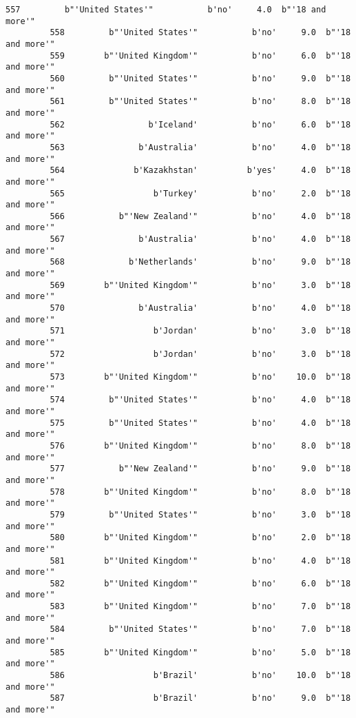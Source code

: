 \documentclass[11pt]{article}
\begin{document}
\begin{Verbatim}[commandchars=\\\{\}]
         557         b"'United States'"           b'no'     4.0  b"'18 and more'"   
         558         b"'United States'"           b'no'     9.0  b"'18 and more'"   
         559        b"'United Kingdom'"           b'no'     6.0  b"'18 and more'"   
         560         b"'United States'"           b'no'     9.0  b"'18 and more'"   
         561         b"'United States'"           b'no'     8.0  b"'18 and more'"   
         562                 b'Iceland'           b'no'     6.0  b"'18 and more'"   
         563               b'Australia'           b'no'     4.0  b"'18 and more'"   
         564              b'Kazakhstan'          b'yes'     4.0  b"'18 and more'"   
         565                  b'Turkey'           b'no'     2.0  b"'18 and more'"   
         566           b"'New Zealand'"           b'no'     4.0  b"'18 and more'"   
         567               b'Australia'           b'no'     4.0  b"'18 and more'"   
         568             b'Netherlands'           b'no'     9.0  b"'18 and more'"   
         569        b"'United Kingdom'"           b'no'     3.0  b"'18 and more'"   
         570               b'Australia'           b'no'     4.0  b"'18 and more'"   
         571                  b'Jordan'           b'no'     3.0  b"'18 and more'"   
         572                  b'Jordan'           b'no'     3.0  b"'18 and more'"   
         573        b"'United Kingdom'"           b'no'    10.0  b"'18 and more'"   
         574         b"'United States'"           b'no'     4.0  b"'18 and more'"   
         575         b"'United States'"           b'no'     4.0  b"'18 and more'"   
         576        b"'United Kingdom'"           b'no'     8.0  b"'18 and more'"   
         577           b"'New Zealand'"           b'no'     9.0  b"'18 and more'"   
         578        b"'United Kingdom'"           b'no'     8.0  b"'18 and more'"   
         579         b"'United States'"           b'no'     3.0  b"'18 and more'"   
         580        b"'United Kingdom'"           b'no'     2.0  b"'18 and more'"   
         581        b"'United Kingdom'"           b'no'     4.0  b"'18 and more'"   
         582        b"'United Kingdom'"           b'no'     6.0  b"'18 and more'"   
         583        b"'United Kingdom'"           b'no'     7.0  b"'18 and more'"   
         584         b"'United States'"           b'no'     7.0  b"'18 and more'"   
         585        b"'United Kingdom'"           b'no'     5.0  b"'18 and more'"   
         586                  b'Brazil'           b'no'    10.0  b"'18 and more'"   
         587                  b'Brazil'           b'no'     9.0  b"'18 and more'"   

\end{Verbatim}
\end{document}
